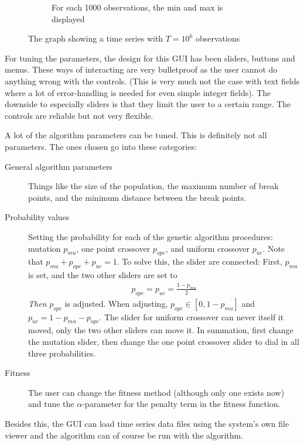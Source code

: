\begin{figure}[h]
\begin{subfigure}[b]{.48\textwidth}
        \caption{For each 1000 observations, the min and max is displayed}
        \label{fig:gui-graph-min-max}
    \end{subfigure}
    \caption{The graph showing a time series with $T = 10^6$ observations}
    \label{fig:gui-graph-ex}
\end{figure}

For tuning the parameters, the design for this GUI has been sliders, buttons and
menus. These ways of interacting are very bulletproof as the user cannot do
anything wrong with the controls. (This is very much not the case with text
fields where a lot of error-handling is needed for even simple integer fields).
The downside to especially sliders is that they limit the user to a certain
range. The controls are reliable but not very flexible. 

A lot of the algorithm parameters can be tuned. This is definitely not all
parameters. The ones chosen go into these categories: 
\begin{description}
    \item[General algorithm parameters] Things like the size of the population,
    the maximum number of break points, and the minimum distance between the
    break points. 

    \item[Probability values] Setting the probability for each of the genetic
    algorithm procedures: mutation $p_{mu}$, one point crossover $p_{opc}$, and
    uniform crossover $p_{uc}$. Note that $p_{mu} + p_{opc} + p_{uc} = 1$. To
    solve this, the slider are connected: First, $p_{mu}$ is set, and the two
    other sliders are set to 
    \begin{align*}
        p_{opc} = p_{uc} = \frac{1 - p_{mu}}{2}
    \end{align*}
    \textit{Then} $p_{opc}$ is adjusted. When adjusting, $p_{opc} \in [0, 1 -
    p_{mu}]$ and $p_{uc} = 1 - p_{mu} - p_{opc}$. The slider for uniform
    crossover can never itself it moved, only the two other sliders can move it.
    In summation, first change the
    mutation slider, then change the one point crossover slider to dial in all
    three probabilities. 

    \item[Fitness] The user can change the fitness method (although only
    one exists now) and tune the $\alpha$-parameter for the penalty term in the
    fitness function. 
\end{description}

Besides this, the GUI can load time series data files using the system's own
file viewer and the algorithm can of course be run with the algorithm. 

